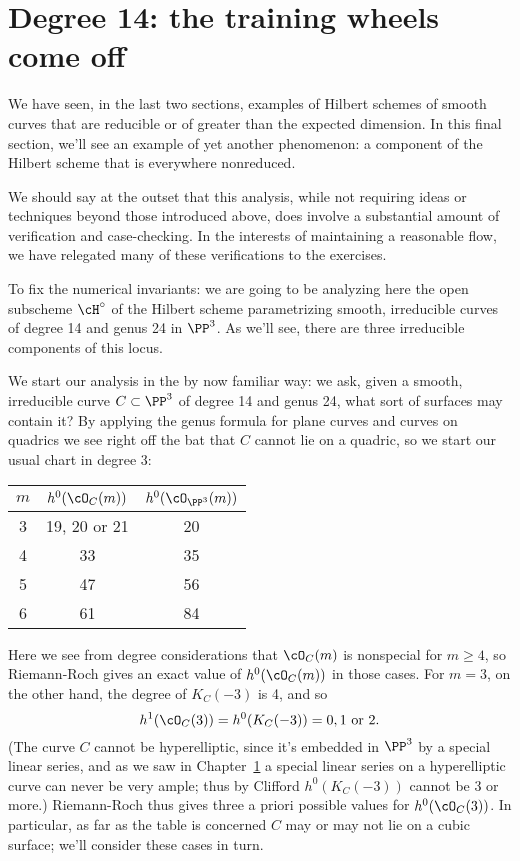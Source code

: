 \section{Degree 14: the training wheels come off}

We have seen, in the last two sections, examples of Hilbert schemes of smooth curves that are reducible or of greater than the expected dimension. In this final section, we'll see an example of yet another phenomenon: a component of the Hilbert scheme that is everywhere nonreduced. 

We should say at the outset that this analysis, while not requiring ideas or techniques beyond those introduced above, does involve a substantial amount of verification and case-checking. In the interests of maintaining a reasonable flow, we have relegated many of these verifications to the exercises.

To fix the numerical invariants: we are going to be analyzing here the open subscheme $\cH^\circ$ of the Hilbert scheme parametrizing smooth, irreducible curves of degree 14 and genus 24 in $\PP^3$. As we'll see, there are three irreducible components of this locus. 

We start our analysis in the by now familiar way: we ask, given a smooth, irreducible curve $C \subset \PP^3$ of degree 14 and genus 24, what sort of surfaces may contain it? By applying the genus formula for plane curves and curves on quadrics we see right off the bat that $C$ cannot lie on a quadric, so we start our usual chart in degree 3:

\begin{center}
\begin{tabular}{ c | c | c }\label{postulation table}
 $m$ & $h^0(\cO_C(m))$ & $h^0(\cO_{\PP^3}(m))$ \\
 \hline
 3 & 19, 20 or 21 & 20 \\
 4 & 33 & 35 \\
 5 & 47 & 56 \\
 6 & 61 & 84
\end{tabular}
\end{center}

Here we see from degree considerations that $\cO_C(m)$ is nonspecial for $m \geq 4$, so Riemann-Roch gives an exact value of $h^0(\cO_C(m))$ in those cases. For $m=3$, on the other hand, the degree of $K_C(-3)$ is 4, and so 
$$
h^1(\cO_C(3)) = h^0(K_C(-3)) = 0, 1 \text{ or } 2.
$$
(The curve $C$ cannot be hyperelliptic, since it's embedded in $\PP^3$ by a special linear series, and as we saw in Chapter~\ref{} a special linear series on a hyperelliptic curve can never be very ample; thus by Clifford $h^0(K_C(-3))$ cannot be 3 or more.) Riemann-Roch thus gives three a priori possible values for $h^0(\cO_C(3))$. In particular, as far as the table is concerned $C$ may or may not lie on a cubic surface; we'll consider these cases in turn.

